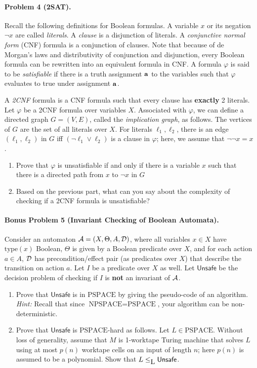 \documentclass[11pt]{article}
\begin{document}
\paragraph{Problem 4 (2SAT).}
Recall the following definitions for Boolean formulas. A variable $x$
or its negation $\neg x$ are called \emph{literals}. A \emph{clause}
is a disjunction of literals. A \emph{conjunctive normal form} (CNF)
formula is a conjunction of clauses. Note that because of de Morgan's
laws and distributivity of conjunction and disjunction, every Boolean
formula can be rewritten into an equivalent formula in CNF. A formula
$\varphi$ is said to be \emph{satisfiable} if there is a truth
assignment ${\bf a}$ to the variables such that $\varphi$ evaluates to
true under assignment ${\bf a}$.

A \emph{2CNF} formula is a CNF formula such that every clause has {\bf
  exactly} 2 literals. Let $\varphi$ be a 2CNF formula over variables
$X$. Associated with $\varphi$, we can define a directed graph $G =
(V,E)$, called the \emph{implication graph}, as follows. The vertices
of $G$ are the set of all literals over $X$. For literals
$\ell_1,\ell_2$, there is an edge $(\ell_1,\ell_2)$ in $G$ iff $(\neg
\ell_1 \vee \ell_2)$ is a clause in $\varphi$; here, we assume that
$\neg \neg x = x$.
\begin{enumerate}
\item Prove that $\varphi$ is unsatisfiable if and only if there is a
  variable $x$ such that there is a directed path from $x$ to $\neg x$
  in $G$
\item Based on the previous part, what can you say about the
  complexity of checking if a 2CNF formula is unsatisfiable? 
\end{enumerate}

\paragraph{Bonus Problem 5 (Invariant Checking of Boolean Automata).}
Consider an automaton ${\cal A} = (X,\Theta,A,{\cal D})$, where all
variables $x \in X$ have $\mathrm{type}(x)$ Boolean, $\Theta$ is given
by a Boolean predicate over $X$, and for each action $a \in A$, ${\cal
  D}$ has precondition/effect pair (as predicates over $X$) that
describe the transition on action $a$. Let $I$ be a predicate over $X$
as well. Let $\mathsf{Unsafe}$ be the decision problem of checking if
$I$ is {\bf not} an invariant of ${\cal A}$.
\begin{enumerate}
\item Prove that $\mathsf{Unsafe}$ is in $\mbox{PSPACE}$ by giving the
  pseudo-code of an algorithm. \emph{Hint:} Recall that since
  $\mbox{NPSPACE} = \mbox{PSPACE}$, your algorithm can be
  non-deterministic.
\item Prove that $\mathsf{Unsafe}$ is $\mbox{PSPACE}$-hard as
  follows. Let $L \in \mbox{PSPACE}$. Without loss of generality,
  assume that $M$ is 1-worktape Turing machine that solves $L$ using
  at most $p(n)$ worktape cells on an input of length $n$; here $p(n)$
  is assumed to be a polynomial. Show that $L \leq_{{\mbox L}}
  \mathsf{Unsafe}$. 
\end{enumerate}







\end{document}
